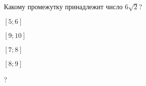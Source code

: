 \begin{ex}
	Какому промежутку принадлежит число $6\sqrt{2}$?
	
	\selectanswer
	\begin{enumcols}[columns=4]
		\item $[5;6]$
		\item $[9;10]$
		\item $[7;8]$
		\item $[8;9]$
	\end{enumcols}
	\begin{answer}
		?
	\end{answer}
\end{ex}